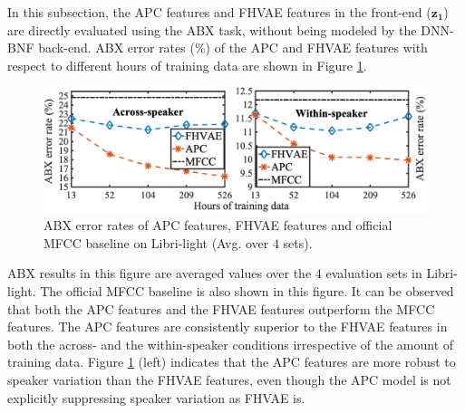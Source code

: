 \documentclass[a4paper]{article}
\begin{document}
In this subsection, the APC  features and FHVAE features in the front-end ($\bm{z_1}$)  are directly evaluated using the ABX task, without being modeled by the  DNN-BNF back-end. %
ABX error rates ($\%$) of the APC     and   FHVAE features with respect to different hours of training data  are shown in Figure \ref{fig:apc_fhvae_mfcc}.
\begin{figure}[!t]
    \centering
    \includegraphics[width=1\linewidth]{LaTeX/apc_fhvae_mfcc_no_sub_hori_no_hrs.png}
    \caption{ABX error rates  of APC features, FHVAE features and official MFCC baseline on Libri-light (Avg. over $4$ sets). }
    \label{fig:apc_fhvae_mfcc}
\end{figure}
ABX results in this figure are averaged values over the $4$ evaluation sets in Libri-light. The official MFCC baseline   \cite{kahn2019librilight} is also shown in this figure. It can be observed that both the APC features and the FHVAE features  outperform the MFCC features. The APC features are consistently superior to the FHVAE features in both the across- and the within-speaker conditions irrespective of the amount of training data.
Figure \ref{fig:apc_fhvae_mfcc} (left) indicates that the APC features are more robust to speaker variation than the FHVAE features, even though the APC model is not explicitly suppressing speaker variation as FHVAE is.

\end{document}
